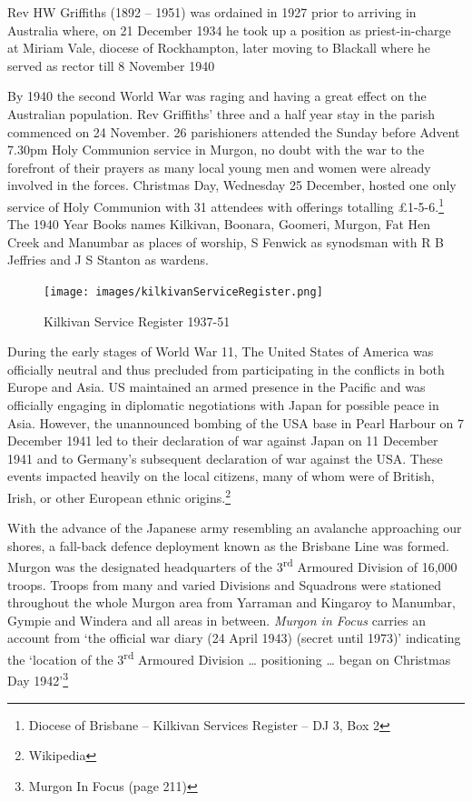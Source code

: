 Rev HW Griffiths (1892 -- 1951) was ordained in 1927 prior to arriving
in Australia where, on 21 December 1934 he took up a position as
priest-in-charge at Miriam Vale, diocese of Rockhampton, later moving to
Blackall where he served as rector till 8 November 1940

By 1940 the second World War was raging and having a great effect on the
Australian population. Rev Griffiths' three and a half year stay in the
parish commenced on 24 November. 26 parishioners attended the Sunday
before Advent 7.30pm Holy Communion service in Murgon, no doubt with the
war to the forefront of their prayers as many local young men and women
were already involved in the forces. Christmas Day, Wednesday 25
December, hosted one only service of Holy Communion with 31 attendees
with offerings totalling \pounds1-5-6.\footnote{Diocese of Brisbane --
  Kilkivan Services Register -- DJ 3, Box 2} The 1940 Year Books names
Kilkivan, Boonara, Goomeri, Murgon, Fat Hen Creek and Manumbar as places
of worship, S Fenwick as synodsman with R B Jeffries and J S Stanton as
wardens.




\begin{figure}
\begin{center}
\texttt{[image: images/kilkivanServiceRegister.png]}
\caption{Kilkivan Service Register 1937-51}
\end{center}
\end{figure}


During the early stages of World War 11, The United States of America
was officially neutral and thus precluded from participating in the
conflicts in both Europe and Asia. US maintained an armed presence in
the Pacific and was officially engaging in diplomatic negotiations with
Japan for possible peace in Asia. However, the unannounced bombing of
the USA base in Pearl Harbour on 7 December 1941 led to their
declaration of war against Japan on 11 December 1941 and to Germany's
subsequent declaration of war against the USA. These events impacted
heavily on the local citizens, many of whom were of British, Irish, or
other European ethnic origins.\footnote{Wikipedia}

With the advance of the Japanese army resembling an avalanche
approaching our shores, a fall-back defence deployment known as the
Brisbane Line was formed. Murgon was the designated headquarters of the
3\textsuperscript{rd} Armoured Division of 16,000 troops. Troops from
many and varied Divisions and Squadrons were stationed throughout the
whole Murgon area from Yarraman and Kingaroy to Manumbar, Gympie and
Windera and all areas in between. \emph{Murgon in Focus} carries an
account from `the official war diary (24 April 1943) (secret until
1973)' indicating the `location of the 3\textsuperscript{rd} Armoured
Division \ldots{} positioning \ldots{} began on Christmas Day
1942'\footnote{Murgon In Focus (page 211)}

